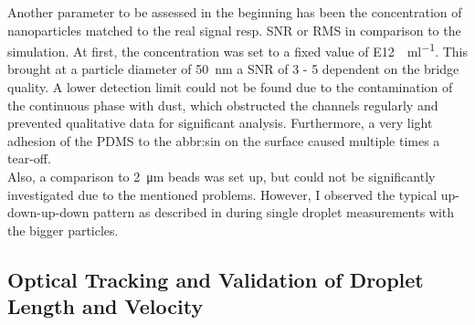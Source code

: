 Another parameter to be assessed in the beginning has been the concentration of nanoparticles matched to the real signal resp. SNR or RMS in comparison to the simulation. At first, the concentration was set to a fixed value of \SI{E12}{\particle\per\ml}. This brought at a particle diameter of \SI{50}{\nm} a SNR of 3 - 5 dependent on the bridge quality. A lower detection limit could not be found due to the contamination of the continuous phase with dust, which obstructed the channels regularly and prevented qualitative data for significant analysis. Furthermore, a very light adhesion of the PDMS to the \acrfull{abbr:sin} on the surface caused multiple times a tear-off.\\
Also, a comparison to \SI{2}{\micro\meter} beads was set up, but could not be significantly investigated due to the mentioned problems. However, I observed the typical up-down-up-down pattern as described in \cite{lit:Bojan} during single droplet measurements with the bigger particles.

\newpage

\subsection{Optical Tracking and Validation of Droplet Length and Velocity}
                        
